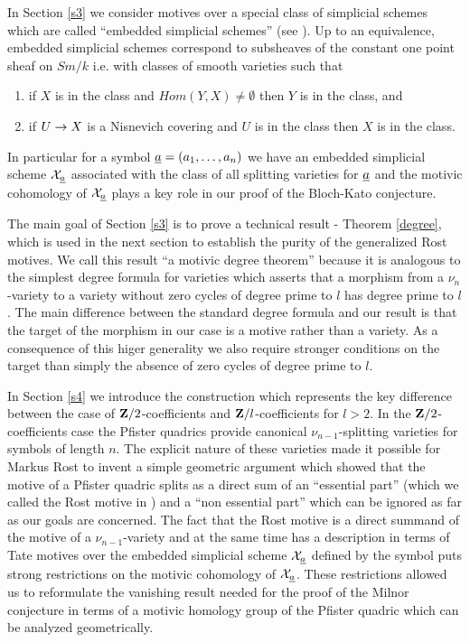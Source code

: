 \documentclass[11pt]{article}
\begin{document}
In Section \ref{s3} we consider motives over a special class of
simplicial schemes which are called ``embedded simplicial schemes''
(see \cite{oversub}). Up to an equivalence, embedded simplicial schemes
correspond to subsheaves of the constant one point sheaf on $Sm/k$
i.e. with classes of smooth varieties such that
%
\begin{enumerate} 
\item if $X$ is in the class and $Hom(Y,X)\ne \emptyset$ then $Y$ is
in the class, and
\item if $U\rightarrow X$ is a Nisnevich covering and $U$ is in the class then
$X$ is in the class.
\end{enumerate}
%
In particular for a symbol $\underline{a}=(a_1,\dots,a_n)$ we have an
embedded simplicial scheme ${\cal X}_{\underline{a}}$ associated with the
class of all splitting varieties for $\underline{a}$ and the motivic cohomology
of ${\cal X}_{\underline{a}}$ plays a key role in our proof of the Bloch-Kato
conjecture.

The main goal of Section \ref{s3} is to prove a technical result - Theorem
\ref{degree}, which is used in the next section to establish the
purity of the generalized Rost motives. We call this result ``a
motivic degree theorem'' because it is analogous to the simplest
degree formula for varieties which asserts that a morphism from a
$\nu_n$-variety to a variety without zero cycles of degree
prime to $l$ has degree prime to $l$. The main difference between the
standard degree formula and our result is that the target of the
morphism in our case is a motive rather than a variety. As a
consequence of this higer generality we also require stronger
conditions on the target than simply the absence of zero cycles of
degree prime to $l$.

In Section \ref{s4} we introduce the construction which represents
the key difference between the case of ${\bf Z\rm}/2$-coefficients and
${\bf Z\rm}/l$-coefficients for $l>2$. In the ${\bf Z\rm}/2$-coefficients case the
Pfister quadrics provide canonical $\nu_{n-1}$-splitting varieties for
symbols of length $n$. The explicit nature of these varieties made it
possible for Markus Rost to invent a simple geometric argument
which showed that the motive of a Pfister quadric splits as a direct
sum of an ``essential part'' (which we called the Rost motive in
\cite{MCpub}) and a ``non essential part'' which can be ignored as far
as our goals are concerned. The fact that the Rost motive is a direct
summand of the motive of a $\nu_{n-1}$-variety and at the same
time has a description in terms of Tate motives over the embedded
simplicial scheme ${\cal X}_{\underline{a}}$ defined by the symbol puts
strong restrictions on the motivic cohomology of ${\cal
X}_{\underline{a}}$. These restrictions allowed us to
reformulate the vanishing result needed for the proof of the Milnor
conjecture in terms of a motivic homology group of the Pfister
quadric which can be analyzed geometrically. 
\end{document}
